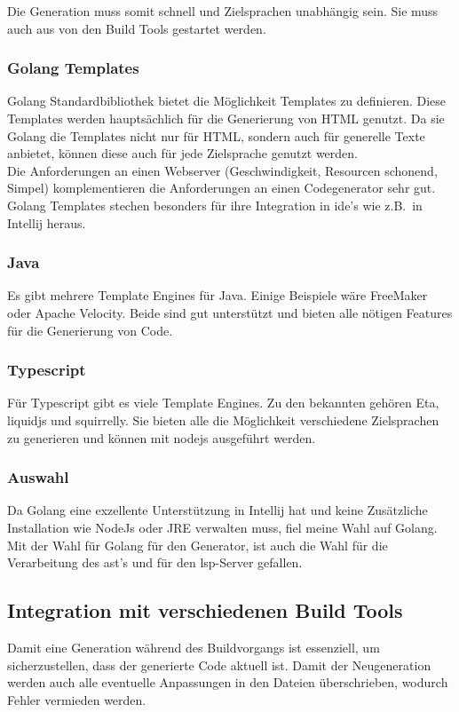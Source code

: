 \documentclass[./einleitung.tex]{subfiles}
\begin{document}
Die Generation muss somit schnell und Zielsprachen unabhängig sein.
Sie muss auch aus von den Build Tools gestartet werden.

\subsubsection{Golang Templates}
Golang Standardbibliothek bietet die Möglichkeit Templates zu definieren.
Diese Templates werden hauptsächlich für die Generierung von HTML genutzt.
Da sie Golang die Templates nicht nur für HTML, sondern auch für generelle Texte anbietet, können diese auch für jede Zielsprache genutzt werden. \\
Die Anforderungen an einen Webserver (Geschwindigkeit, Resourcen schonend, Simpel) komplementieren die Anforderungen an einen Codegenerator sehr gut. \\
Golang Templates stechen besonders für ihre Integration in \acrshort{ide}'s wie z.B.\ in Intellij heraus.

\subsubsection{Java}
Es gibt mehrere Template Engines für Java.
Einige Beispiele wäre FreeMaker oder Apache Velocity.
Beide sind gut unterstützt und bieten alle nötigen Features für die Generierung von Code.

\subsubsection{Typescript}
Für Typescript gibt es viele Template Engines.
Zu den bekannten gehören Eta, liquidjs und squirrelly.
Sie bieten alle die Möglichkeit verschiedene Zielsprachen zu generieren und können mit nodejs ausgeführt werden.

\subsubsection{Auswahl}
Da Golang eine exzellente Unterstützung in Intellij hat und keine Zusätzliche Installation wie NodeJs oder JRE verwalten muss, fiel meine Wahl auf Golang.
\newline
Mit der Wahl für Golang für den Generator, ist auch die Wahl für die Verarbeitung des \acrshort{ast}'s und für den \acrlong{lsp}-Server gefallen.

\subsection{Integration mit verschiedenen Build Tools}
Damit eine Generation während des Buildvorgangs ist essenziell, um sicherzustellen, dass der generierte Code aktuell ist.
Damit der Neugeneration werden auch alle eventuelle Anpassungen in den Dateien überschrieben, wodurch Fehler vermieden werden.
\end{document}
